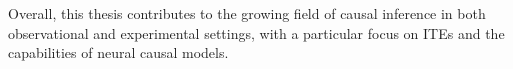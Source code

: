 Overall, this thesis contributes to the growing field of causal inference in both observational and experimental settings, with a particular focus on ITEs and the capabilities of neural causal models.

% 
% 
% 
% 
% 
% 

